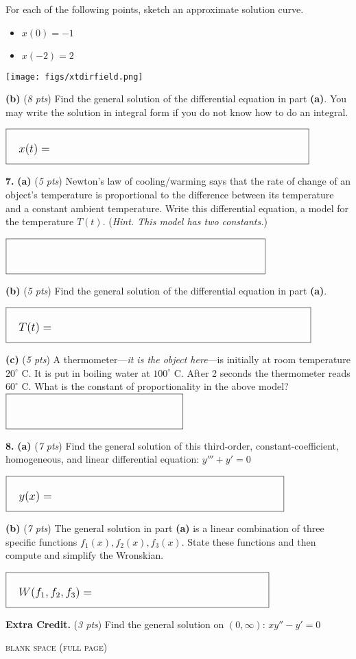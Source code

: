 \documentclass[11pt]{amsart}
\newcommand{\ds}{\displaystyle}
\newcommand{\prob}[1]{\bigskip\noindent\textbf{#1.} }
\newcommand{\pts}[1]{(\emph{#1 pts})}
\newcommand{\probpts}[2]{\prob{#1} \pts{#2} \quad}
\newcommand{\ppartpts}[2]{\textbf{(#1)} \pts{#2} \quad}
\newcommand{\epartpts}[2]{\medskip\noindent \textbf{(#1)} \pts{#2} \quad}
\newcommand{\boxy}[1]{\fbox{\Huge \strut \hspace{#1mm} \strut}}
\newcommand{\boxycontent}[2]{\fbox{\quad {\large #2} {\Huge \strut \hspace{#1mm} \strut}}}
\begin{document}
For each of the following points, sketch an approximate solution curve.

\medskip
\begin{itemize}
\item $x(0)=-1$

\medskip
\item $x(-2)=2$
\end{itemize}

\vspace{-10mm}
\hfill \texttt{[image: figs/xtdirfield.png]}

\bigskip
\epartpts{b}{8}  Find the general solution of the differential equation in part \textbf{(a)}.  You may write the solution in integral form if you do not know how to do an integral.
\vfill

\hfill $\boxycontent{90}{$x(t)=$}$


\clearpage
\newpage
\prob{7}  \ppartpts{a}{5}  Newton's law of cooling/warming says that the rate of change of an object's temperature is proportional to the difference between its temperature and a constant ambient temperature.  Write this differential equation, a model for the temperature $T(t)$.  (\emph{Hint.  This model has two constants.})

\vspace{5mm}

\hfill $\boxy{90}$ \phantom{lkadjsf asdf adskfj}

\bigskip
\epartpts{b}{5}  Find the general solution of the differential equation in part \textbf{(a)}.
\vfill

\hfill $\boxycontent{90}{$T(t)=$}$

\bigskip
\epartpts{c}{5}  A thermometer---\emph{it is the object here}---is initially at room temperature $20^\circ$ C.  It is put in boiling water at $100^\circ$ C.  After 2 seconds the thermometer reads $60^\circ$ C.  What is the constant of proportionality in the above model?
\vfill
\hfill $\boxy{60}$


\clearpage
\newpage
\prob{8}  \ppartpts{a}{7}  Find the general solution of this third-order, constant-coefficient, homogeneous, and linear differential equation: \quad {\LARGE \strut} {\large $\ds y''' + y' = 0$}
\vfill

\hfill $\boxycontent{80}{$y(x)=$}$

\bigskip
\epartpts{b}{7}  The general solution in part \textbf{(a)} is a linear combination of three specific functions $f_1(x),f_2(x),f_3(x)$.  State these functions and then compute and simplify the Wronskian.
\vfill

\hfill $\boxycontent{60}{$W(f_1,f_2,f_3)=$}$


\bigskip
\probpts{Extra Credit}{3}  Find the general solution on $(0,\infty)$: \quad $x y'' - y' = 0$
\vspace{2.0in}


\clearpage
\newpage
\thispagestyle{empty}
\begin{center}
\small
\textsc{blank space (full page)}
\end{center}
\vfill
\end{document}
